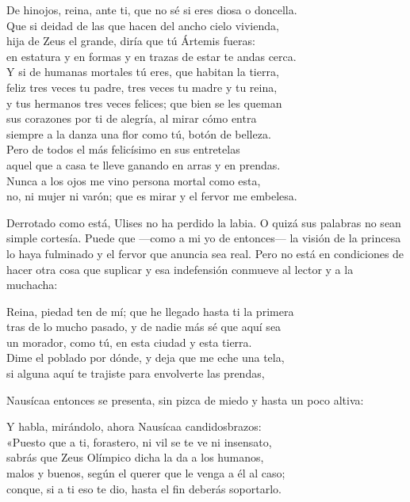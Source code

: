 \begin{versocita}
De hinojos, reina, ante ti, que no sé si eres diosa o doncella.\\
Que si deidad de las que hacen del ancho cielo vivienda,\\
hija de Zeus el grande, diría que tú Ártemis fueras:\\
en estatura y en formas y en trazas de estar te andas cerca.\\
Y si de humanas mortales tú eres, que habitan la tierra,\\
feliz tres veces tu padre, tres veces tu madre y tu reina,\\
y tus hermanos tres veces felices; que bien se les queman\\
sus corazones por ti de alegría, al mirar cómo entra\\
siempre a la danza una flor como tú, botón de belleza.\\
Pero de todos el más felicísimo en sus entretelas\\
aquel que a casa te lleve ganando en arras y en prendas.\\
Nunca a los ojos me vino persona mortal como esta,\\
no, ni mujer ni varón; que es mirar y el fervor me embelesa.
\end{versocita}

Derrotado como está, Ulises no ha perdido la labia. O quizá sus palabras no sean simple cortesía. Puede que ---como a mi yo de entonces--- la visión de la princesa lo haya fulminado y el fervor que anuncia sea real. Pero no está en condiciones de hacer otra cosa que suplicar y esa indefensión conmueve al lector y a la muchacha:

\begin{versocita}
Reina, piedad ten de mí; que he llegado hasta ti la primera\\
tras de lo mucho pasado, y de nadie más sé que aquí sea\\
un morador, como tú, en esta ciudad y esta tierra.\\
Dime el poblado por dónde, y deja que me eche una tela,\\
si alguna aquí te trajiste para envolverte las prendas,
\end{versocita}

Nausícaa entonces se presenta, sin pizca de miedo y hasta un poco altiva:

\begin{versocita}
Y habla, mirándolo, ahora Nausícaa candidosbrazos:\\
«Puesto que a ti, forastero, ni vil se te ve ni insensato,\\
sabrás que Zeus Olímpico dicha la da a los humanos,\\
malos y buenos, según el querer que le venga a él al caso;\\
conque, si a ti eso te dio, hasta el fin deberás soportarlo.
\end{versocita}

